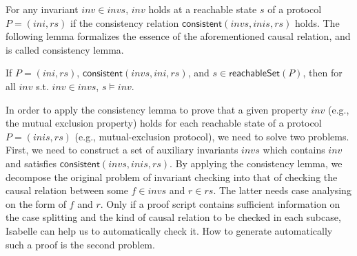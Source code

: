 \documentclass{llncs}
\newcommand\cai[1]{\textcolor{blue}{ #1} }
\begin{document}



For any invariant $inv \in invs$, $inv$ holds at a reachable state $s$  of a protocol $P=(ini,rs)$  if the consistency relation
$\mathsf{consistent}( invs, inis, rs)$ holds. %
The following lemma formalizes the essence of the aforementioned causal relation, and is called consistency lemma.

\begin{lemma}\label{consistentLemma}%
 If $P=(ini,rs)$, $\mathsf{consistent}( invs, ini, rs)$, and $s  \in \mathsf{reachableSet}(P)$, %
 then   for all $inv$ s.t. $inv \in invs$, $s \models inv $.
\end{lemma}




In order to  apply the consistency lemma to prove that a given property $inv$ (e.g., the mutual exclusion property) holds for each reachable state of a protocol $P=(inis,rs)$ (e.g., mutual-exclusion protocol), we need to solve two problems. First, we need to construct a set of auxiliary invariants $invs$ which contains $inv$ and satisfies  $\mathsf{consistent}( invs, inis, rs)$.  By applying the consistency lemma, we  decompose the original problem of invariant checking into that of checking the causal relation between some $f\in invs$ and $r \in rs$. The latter needs   case analysing on the form of $f$ and $r$.  Only if a proof script contains sufficient information on the case splitting and  the kind of causal relation to be checked in each subcase, Isabelle can help us to automatically  check it. How to  generate automatically such a proof is the second problem.

\end{document}

